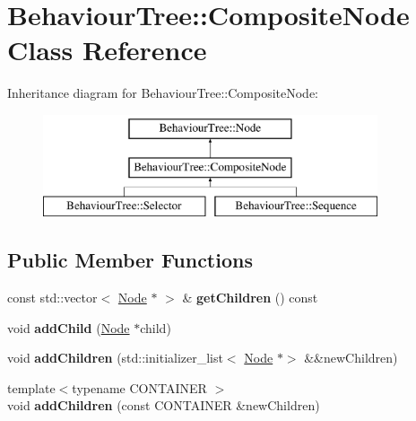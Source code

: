 \hypertarget{class_behaviour_tree_1_1_composite_node}{}\section{Behaviour\+Tree\+:\+:Composite\+Node Class Reference}
\label{class_behaviour_tree_1_1_composite_node}
Inheritance diagram for Behaviour\+Tree\+:\+:Composite\+Node\+:\begin{figure}[H]
\begin{center}
\leavevmode
\includegraphics[height=3.000000cm]{class_behaviour_tree_1_1_composite_node}
\end{center}
\end{figure}
\subsection*{Public Member Functions}
\begin{DoxyCompactItemize}
\item 
\mbox{\label{class_behaviour_tree_1_1_composite_node_a30dc5790c2ac65a7afd2311a071b15aa}} 
const std\+::vector$<$ \hyperlink{class_behaviour_tree_1_1_node}{Node} $\ast$ $>$ \& {\bfseries get\+Children} () const
\item 
\mbox{\label{class_behaviour_tree_1_1_composite_node_a4ca3dcdd5bbe613d8f251a619a3240ba}} 
void {\bfseries add\+Child} (\hyperlink{class_behaviour_tree_1_1_node}{Node} $\ast$child)
\item 
\mbox{\label{class_behaviour_tree_1_1_composite_node_a98d1b1bd7079079e89c9e10439928e24}} 
void {\bfseries add\+Children} (std\+::initializer\+\_\+list$<$ \hyperlink{class_behaviour_tree_1_1_node}{Node} $\ast$$>$ \&\&new\+Children)
\item 
\mbox{\label{class_behaviour_tree_1_1_composite_node_ac2289d771089181e6bd4c7867ec21364}} 
{\footnotesize template$<$typename C\+O\+N\+T\+A\+I\+N\+ER $>$ }\\void {\bfseries add\+Children} (const C\+O\+N\+T\+A\+I\+N\+ER \&new\+Children)
\end{DoxyCompactItemize}
